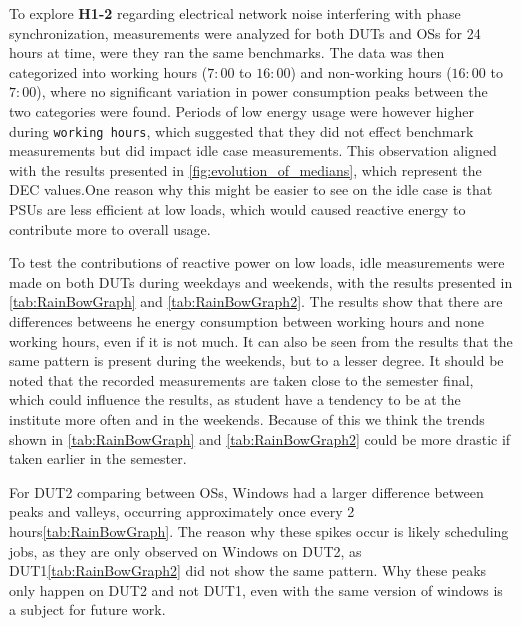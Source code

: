 
To explore \textbf{H1-2} regarding electrical network noise interfering with phase synchronization, measurements were analyzed for both DUTs and OSs for 24 hours at time, were they ran the same benchmarks. The data was then categorized into working hours ($7:00$ to $16:00$) and non-working hours ($16:00$ to $7:00$), where no significant variation in power consumption peaks between the two categories were found. Periods of low energy usage were however higher during \texttt{working hours}, which suggested that they did not effect benchmark measurements but did impact idle case measurements. This observation aligned with the results presented in \cref{fig:evolution_of_medians}, which represent the DEC values.One reason why this might be easier to see on the idle case is that PSUs are less efficient at low loads, which would caused reactive energy to contribute more to overall usage.\cite{PowerSupply} 

To test the contributions of reactive power on low loads, idle measurements were made on both DUTs during weekdays and weekends, with the results presented in  \cref{tab:RainBowGraph} and \cref{tab:RainBowGraph2}. The results show that there are differences betweens he energy consumption between working hours and none working hours, even if it is not much. It can also be seen from the results that the same pattern is present during the weekends, but to a lesser degree. It should be noted that the recorded measurements are taken close to the semester final, which could influence the results, as student have a tendency to be at the institute more often and in the weekends. Because of this we think the trends shown in \cref{tab:RainBowGraph} and \cref{tab:RainBowGraph2} could be more drastic if taken earlier in the semester.

For DUT2 comparing between OSs, Windows had a larger difference between peaks and valleys, occurring approximately once every 2 hours\cref{tab:RainBowGraph}. The reason why these spikes occur is likely scheduling jobs, as they are only observed on Windows on DUT2, as DUT1\cref{tab:RainBowGraph2} did not show the same pattern. Why these peaks only happen on DUT2 and not DUT1, even with the same version of windows is a subject for future work. 


